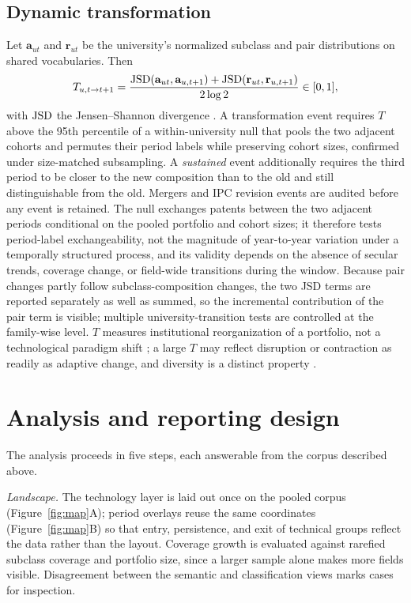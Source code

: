 \subsection{Dynamic transformation}
Let $\mathbf{a}_{ut}$ and $\mathbf{r}_{ut}$ be the university's normalized
subclass and pair distributions on shared vocabularies. Then
\begin{equation}
T_{u,t\rightarrow t+1}=\frac{
\operatorname{JSD}(\mathbf{a}_{ut},\mathbf{a}_{u,t+1})+
\operatorname{JSD}(\mathbf{r}_{ut},\mathbf{r}_{u,t+1})}{2\log2}\in[0,1],
\label{eq:transformation}
\end{equation}
with $\operatorname{JSD}$ the Jensen--Shannon divergence \citep{lin1991}. A transformation
event requires $T$ above the 95th percentile of a within-university null that
pools the two adjacent cohorts and permutes their period labels while
preserving cohort sizes, confirmed under size-matched subsampling. A
\emph{sustained} event additionally requires the third period to be closer to
the new composition than to the old and still distinguishable from the old.
Mergers and IPC revision events are audited before any event is retained. The
null exchanges patents between the two adjacent periods conditional on the
pooled portfolio and cohort sizes; it therefore tests period-label
exchangeability, not the magnitude of year-to-year variation under a
temporally structured process, and its validity depends on the absence of
secular trends, coverage change, or field-wide transitions during the window.
Because pair changes partly follow subclass-composition changes, the two JSD
terms are reported separately as well as summed, so the incremental
contribution of the pair term is visible; multiple university-transition tests
are controlled at the family-wise level. $T$ measures institutional
reorganization of a portfolio, not a technological paradigm shift
\citep{dosi1982,funk2017}; a large $T$ may reflect disruption or contraction as
readily as adaptive change, and diversity is a distinct property
\citep{stirling2007,porter2009}.

\section{Analysis and reporting design}\label{sec:analysis}
The analysis proceeds in five steps, each answerable from the corpus described
above.

\emph{Landscape.} The technology layer is laid out once on the pooled corpus
(Figure~\ref{fig:map}A); period overlays reuse the same coordinates
(Figure~\ref{fig:map}B) so that entry, persistence, and exit of technical
groups reflect the data rather than the layout. Coverage growth is evaluated
against rarefied subclass coverage and portfolio size, since a larger sample
alone makes more fields visible. Disagreement between the semantic and
classification views marks cases for inspection.

